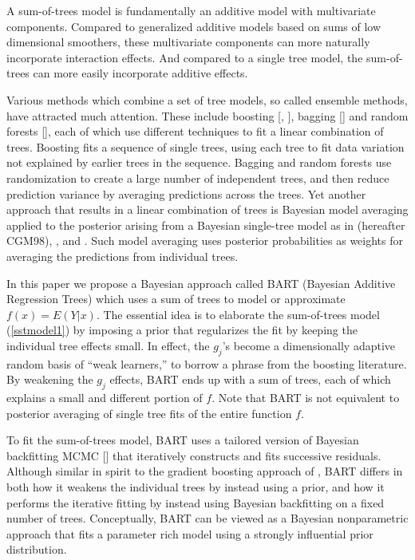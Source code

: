 \documentclass[aoas,nameyear,dvips]{arximspdf}
\newcommand{\citeasnoun}[1]{\citet{#1}}
\begin{document}
A sum-of-trees model is fundamentally an additive model with multivariate components.
Compared to generalized additive models based on sums of low dimensional smoothers,
these multivariate components can more naturally incorporate interaction effects.
And compared to a single tree model, the sum-of-trees can more easily
incorporate additive effects.



Various methods which combine a set of tree models, so called
ensemble methods, have attracted much attention. These include
boosting [\citeasnoun{FreSch1997}, \citeasnoun{Fri2001}], bagging [\citet{Br96a}] and random
forests [\citet{Bre2001}], each of which use
different techniques to fit a linear combination of trees. Boosting
fits a sequence of single trees, using each tree to fit data
variation not explained by earlier trees in the sequence. Bagging
and random forests use randomization to
create a large number of independent trees, and then reduce
prediction variance by averaging predictions across the trees. Yet
another approach that results in a linear combination of trees is
Bayesian model averaging applied to the posterior arising from a
Bayesian single-tree model as in \citeasnoun{ChipGeorMcCu1998a}
(hereafter CGM98), \citeasnoun{DeniMallSmit1998}, \citeasnoun{Blan2004} and
\citeasnoun{WuTjeWes2007}.  Such model averaging uses posterior
probabilities as weights for averaging the predictions from
individual trees.


In this paper we propose a Bayesian approach called BART (Bayesian
Additive Regression Trees) which uses a sum of trees to model or
approximate  $f(x) = E(Y | x)$. The
essential idea is to elaborate the sum-of-trees model
(\ref{sstmodel1}) by imposing a prior that regularizes the fit
by keeping the individual tree effects small.  In effect, the $g_j$'s become
a dimensionally adaptive random basis of ``weak learners,'' to
borrow a phrase from the boosting literature.  By weakening the $g_j$ effects,
BART ends up with a sum of trees, each of which explains a small and
different portion of $f$.  Note that BART is not equivalent to posterior averaging
of single tree fits of the entire function $f$.

To fit the sum-of-trees model, BART uses a tailored version of
Bayesian backfitting MCMC [\citet{HastTibs2000}] that
iteratively constructs and fits successive residuals. Although
similar in spirit to the gradient boosting approach of
\citeasnoun{Fri2001}, BART differs in both how it weakens the
individual trees by instead using a prior, and how it performs the
iterative fitting by instead using Bayesian backfitting on a fixed
number of trees.  Conceptually, BART can be viewed as a Bayesian
nonparametric approach that fits a parameter rich model using
a strongly influential prior distribution.
\end{document}
